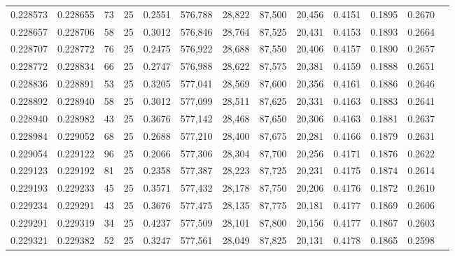 \begin{tabular}{rrrrrrrrrrrrr}
0.228573 & 0.228655 &    73 &  25 &                                     0.2551 & 576,788 &  28,822 &  87,500 &  20,456 & 0.4151 & 0.1895 & 0.2670 \\
0.228657 & 0.228706 &    58 &  25 &                                     0.3012 & 576,846 &  28,764 &  87,525 &  20,431 & 0.4153 & 0.1893 & 0.2664 \\
0.228707 & 0.228772 &    76 &  25 &                                     0.2475 & 576,922 &  28,688 &  87,550 &  20,406 & 0.4157 & 0.1890 & 0.2657 \\
0.228772 & 0.228834 &    66 &  25 &                                     0.2747 & 576,988 &  28,622 &  87,575 &  20,381 & 0.4159 & 0.1888 & 0.2651 \\
0.228836 & 0.228891 &    53 &  25 &                                     0.3205 & 577,041 &  28,569 &  87,600 &  20,356 & 0.4161 & 0.1886 & 0.2646 \\
0.228892 & 0.228940 &    58 &  25 &                                     0.3012 & 577,099 &  28,511 &  87,625 &  20,331 & 0.4163 & 0.1883 & 0.2641 \\
0.228940 & 0.228982 &    43 &  25 &                                     0.3676 & 577,142 &  28,468 &  87,650 &  20,306 & 0.4163 & 0.1881 & 0.2637 \\
0.228984 & 0.229052 &    68 &  25 &                                     0.2688 & 577,210 &  28,400 &  87,675 &  20,281 & 0.4166 & 0.1879 & 0.2631 \\
0.229054 & 0.229122 &    96 &  25 &                                     0.2066 & 577,306 &  28,304 &  87,700 &  20,256 & 0.4171 & 0.1876 & 0.2622 \\
0.229123 & 0.229192 &    81 &  25 &                                     0.2358 & 577,387 &  28,223 &  87,725 &  20,231 & 0.4175 & 0.1874 & 0.2614 \\
0.229193 & 0.229233 &    45 &  25 &                                     0.3571 & 577,432 &  28,178 &  87,750 &  20,206 & 0.4176 & 0.1872 & 0.2610 \\
0.229234 & 0.229291 &    43 &  25 &                                     0.3676 & 577,475 &  28,135 &  87,775 &  20,181 & 0.4177 & 0.1869 & 0.2606 \\
0.229291 & 0.229319 &    34 &  25 &                                     0.4237 & 577,509 &  28,101 &  87,800 &  20,156 & 0.4177 & 0.1867 & 0.2603 \\
0.229321 & 0.229382 &    52 &  25 &                                     0.3247 & 577,561 &  28,049 &  87,825 &  20,131 & 0.4178 & 0.1865 & 0.2598 \\

\end{tabular}

